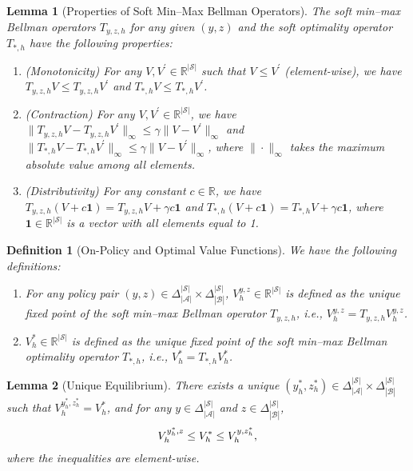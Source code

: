 \documentclass[10pt,a4paper]{amsart}
\newtheorem{lemma}{Lemma}
\newtheorem{definition}{Definition}
\def\cA{\mathcal A}
\def\cB{\mathcal B}
\begin{document}
\begin{lemma}[Properties of Soft Min--Max Bellman Operators]
    \label{lemma: reg-min-max-bellman-operator-properties}
    The soft min--max Bellman operators $T_{y,z,h}$ for any given $(y,z)$ and the soft optimality operator $T_{*,h}$ have the following properties:
    \begin{enumerate}[label=\roman*.]
        \item (Monotonicity) For any $V, V^\prime \in \mathbb{R}^{|\mathcal{S}|}$ such that $V \le V^\prime$ (element-wise), we have $T_{y,z,h} V \le T_{y,z,h} V^\prime$ and $T_{*,h} V \le T_{*,h} V^\prime$.
        \item (Contraction) For any $V, V^\prime \in \mathbb{R}^{|\mathcal{S}|}$, we have $\|T_{y,z,h} V - T_{y,z,h} V^\prime\|_\infty \le \gamma \| V - V^\prime \|_\infty$ and $\|T_{*,h} V - T_{*,h} V^\prime\|_\infty \le \gamma \| V - V^\prime \|_\infty$, where $\|\cdot\|_\infty$ takes the maximum absolute value among all elements.
        \item (Distributivity) For any constant $c \in \mathbb{R}$, we have $T_{y,z,h} (V + c \mathbf{1}) = T_{y,z,h} V + \gamma c \mathbf{1}$ and $T_{*,h} (V + c \mathbf{1}) = T_{*,h} V + \gamma c \mathbf{1}$, where $\mathbf{1} \in \mathbb{R}^{|\mathcal{S}|}$ is a vector with all elements equal to 1.
    \end{enumerate}
\end{lemma}

\begin{definition}[On-Policy and Optimal Value Functions]
    \label{definition: bellman-fixed-point-value-functions}
    We have the following definitions:
    \begin{enumerate}
        \item For any policy pair $(y, z) \in \Delta_{|\cA|}^{|\mathcal{S}|} \times \Delta_{|\cB|}^{|\mathcal{S}|}$, $V^{y,z}_h \in \mathbb{R}^{|\mathcal{S}|}$ is defined as the unique fixed point of the soft min--max Bellman operator $T_{y,z,h}$, i.e., $V^{y,z}_h = T_{y,z,h} V^{y,z}_h$.
        \item $V^{*}_h \in \mathbb{R}^{|\mathcal{S}|}$ is defined as the unique fixed point of the soft min--max Bellman optimality operator $T_{*,h}$, i.e., $V^{*}_h = T_{*,h} V^{*}_h$.
    \end{enumerate}
\end{definition}

\begin{lemma}[Unique Equilibrium]
    \label{lemma: unique-optimal-solution-min-max-mdp}
    There exists a unique $(y_h^*, z_h^*) \in \Delta_{|\cA|}^{|\mathcal{S}|} \times \Delta_{|\cB|}^{|\mathcal{S}|}$ such that $V^{y_h^*,z_h^*}_h = V^{*}_h$, and for any $y \in \Delta_{|\cA|}^{|\mathcal{S}|}$ and $z \in \Delta_{|\cB|}^{|\mathcal{S}|}$, 
    \begin{align}
        V^{y_h^*,z}_h \le V^{*}_h \le V^{y,z_h^*}_h,\notag
    \end{align}
    where the inequalities are element-wise.
\end{lemma}
\end{document}
